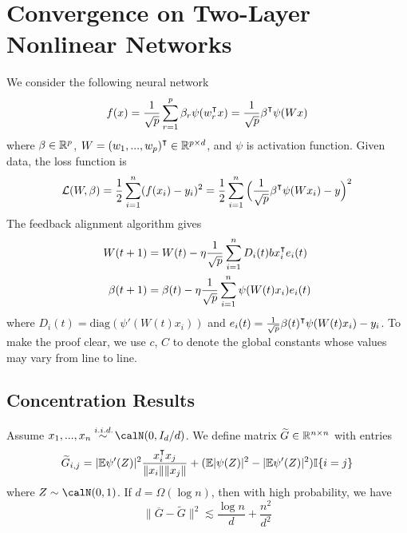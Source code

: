 
\section{Convergence on Two-Layer Nonlinear Networks}\label{sec:appendix-convergence}
We consider the following neural network
\begin{equation}
f(x) = \frac{1}{\sqrt p}\sum_{r=1}^p \beta_r \psi(w_r\transpose x) = \frac{1}{\sqrt p}\beta\transpose \psi(Wx)
\end{equation}
where $\beta \in \mathbb{R}^p$, $W = (w_1,...,w_p)\transpose\in\R^{p\times d}$, and $\psi$ is activation function. Given data, the loss function is 
\begin{equation}
\Loss(W, \beta) = \frac{1}{2}\sum_{i=1}^n(f(x_i)-y_i)^2 = \frac{1}{2}\sum_{i=1}^n\Big(\frac{1}{\sqrt p}\beta\transpose \psi(Wx_i)-y\Big)^2
\end{equation}
The feedback alignment algorithm gives
\begin{equation}
\label{eq:updates}
\begin{aligned}
    W(t+1) &= W(t) - \eta\frac{1}{\sqrt p}\sum_{i=1}^nD_i(t)bx_i\transpose e_i(t) \\
    \beta(t+1) &= \beta(t)- \eta \frac{1}{\sqrt p}\sum_{i=1}^n \psi(W(t)x_i)e_i(t)
\end{aligned}
\end{equation}
where $D_i(t) = \text{diag}(\psi'(W(t)x_i))$ and $e_i(t) = \frac{1}{\sqrt p}\beta(t)\transpose \psi(W(t)x_i)-y_i$. To make the proof clear, we use $c$, $C$ to denote the global constants whose values may vary from line to line.

\subsection{Concentration Results}

\begin{lemma}\label{lma:G}
Assume $x_1,...,x_n \overset{\iid}{\sim} \calN(0,I_d/d)$. We define  matrix $\widetilde{G}\in \mathbb{R}^{n\times n}$ with entries
\begin{equation*}
    \widetilde{G}_{i,j} = |\E\psi'(Z)|^2 \frac{x_i\transpose x_j}{\|x_i\|\|x_j\|} + (\E|\psi(Z)|^2-|\E\psi'(Z)|^2)\I\{i=j\}
\end{equation*}
where $Z\sim \calN(0,1)$. If $d = \Omega(\log n)$, then with high probability, we have
\begin{equation*}
\|\overline{G}-\widetilde{G}\|^2 \lesssim \frac{\log n}{d} + \frac{n^2}{d^2}
\end{equation*}
\end{lemma}


